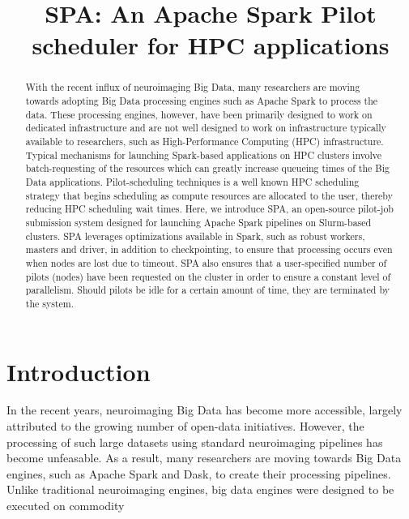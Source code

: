 \documentclass{IEEEtran}
\begin{document}
\title{SPA: An Apache Spark Pilot scheduler for HPC applications}
\author{
    \IEEEauthorblockA{}
}
\maketitle

\begin{abstract}
    With the recent influx of neuroimaging Big Data, many researchers are moving
    towards adopting Big Data processing engines such as Apache Spark 
    to process the data. These processing engines, however, have been primarily 
    designed to work on dedicated infrastructure and are not well designed to 
    work on infrastructure typically available to researchers, such as 
    High-Performance Computing (HPC) infrastructure. Typical mechanisms for 
    launching Spark-based applications on HPC clusters involve batch-requesting
    of the resources which can greatly increase queueing times of the Big Data 
    applications. Pilot-scheduling techniques is a well known HPC scheduling
    strategy that begins scheduling as compute resources are allocated to the 
    user, thereby reducing HPC scheduling wait times. Here, we introduce SPA, an
    open-source
    pilot-job submission system designed for launching Apache Spark pipelines 
    on Slurm-based clusters. SPA leverages optimizations available in Spark, 
    such as robust workers, masters and driver, in addition to checkpointing, 
    to ensure that processing occurs even when nodes are lost due to timeout. 
    SPA also ensures that a user-specified number of pilots (nodes) have been 
    requested on the cluster in order to ensure a constant level of parallelism.
    Should pilots be idle for a certain amount of time, they are terminated by 
    the system.

\end{abstract}

\section{Introduction}

In the recent years, neuroimaging Big Data has become more accessible, largely 
attributed to the growing number of open-data initiatives. However, the
processing of such large datasets using standard neuroimaging pipelines has 
become unfeasable. As a result, many researchers are moving towards Big Data 
engines, such as Apache Spark and Dask, to create their processing pipelines. 
Unlike traditional neuroimaging engines, big data engines were designed to be 
executed on commodity 
\end{document}

